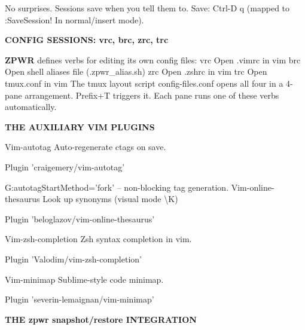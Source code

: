 \documentclass[11pt,a4paper,twoside]{book}
\begin{document}
No surprises. Sessions save when you tell them to. Save: Ctrl-D q (mapped to :SaveSession! In normal/insert mode).


\vspace{12pt}
{\bfseries\color{neonyellow} CONFIG SESSIONS: vrc, brc, zrc, trc}\vspace{4pt}

\textbf{ZPWR} defines verbs for editing its own config files: vrc   Open .vimrc in vim brc   Open shell aliases file (.zpwr\_alias.sh) zrc   Open .zshrc in vim trc   Open tmux.conf in vim The tmux layout script config-files.conf opens all four in a 4-pane arrangement. Prefix+T triggers it. Each pane runs one of these verbs automatically.


\vspace{12pt}
{\bfseries\color{neonyellow} THE AUXILIARY VIM PLUGINS}\vspace{4pt}

Vim-autotag           Auto-regenerate ctags on save.

\begin{codebox}
\color{neongreen}Plugin 'craigemery/vim-autotag'\\
\end{codebox}

G:autotagStartMethod='fork' -- non-blocking tag generation. Vim-online-thesaurus   Look up synonyms (visual mode \textbackslash{}K)

\begin{codebox}
\color{neongreen}Plugin 'beloglazov/vim-online-thesaurus'\\
\end{codebox}

Vim-zsh-completion     Zsh syntax completion in vim.

\begin{codebox}
\color{neongreen}Plugin 'Valodim/vim-zsh-completion'\\
\end{codebox}

Vim-minimap            Sublime-style code minimap.

\begin{codebox}
\color{neongreen}Plugin 'severin-lemaignan/vim-minimap'\\
\end{codebox}


\vspace{12pt}
{\bfseries\color{neonyellow} THE zpwr snapshot/restore INTEGRATION}\vspace{4pt}
\end{document}
